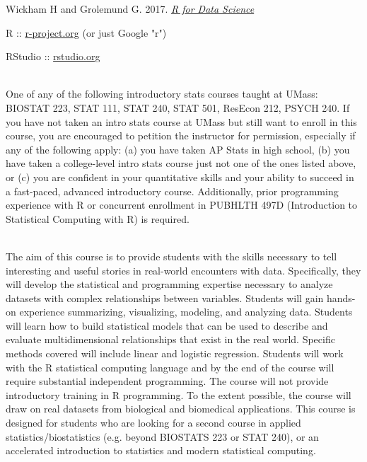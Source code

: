 \documentclass[10pt]{article}
\begin{document}
Wickham H and Grolemund G. 2017. \emph{\href{https://r4ds.had.co.nz/index.html}{R for Data Science}}


{}

R :: \href{http://www.r-project.org}{r-project.org} (or just Google "r")

RStudio :: \href{http://www.rstudio.org}{rstudio.org}


\bigskip
{}\\
One of any of the following introductory stats courses taught at UMass: BIOSTAT 223, STAT 111, STAT 240, STAT 501, ResEcon 212, PSYCH 240. If you have not taken an intro stats course at UMass but still want to enroll in this course, you are encouraged to petition the instructor for permission, especially if any of the following apply: (a) you have taken AP Stats in high school, (b) you have taken a college-level intro stats course just not one of the ones listed above, or (c) you are confident in your quantitative skills and your ability to succeed in a fast-paced, advanced introductory course. Additionally, prior programming experience with R or concurrent enrollment in PUBHLTH 497D (Introduction to Statistical Computing with R) is required.


\bigskip
{}\\
The aim of this course is to provide students with the skills necessary to tell interesting and useful stories in real-world encounters with data. Specifically, they will develop the statistical and programming expertise necessary to analyze datasets with complex relationships between variables. Students will gain hands-on experience summarizing, visualizing, modeling, and analyzing data. Students will learn how to build statistical models that can be used to describe and evaluate multidimensional relationships that exist in the real world. Specific methods covered will include linear and logistic regression. Students will work with the R statistical computing language and by the end of the course will require substantial independent programming. The course will not provide introductory training in R programming. To the extent possible, the course will draw on real datasets from biological and biomedical applications. This course is designed for students who are looking for a second course in applied statistics/biostatistics (e.g. beyond BIOSTATS 223 or STAT 240), or an accelerated introduction to statistics and modern statistical computing.
\end{document}
